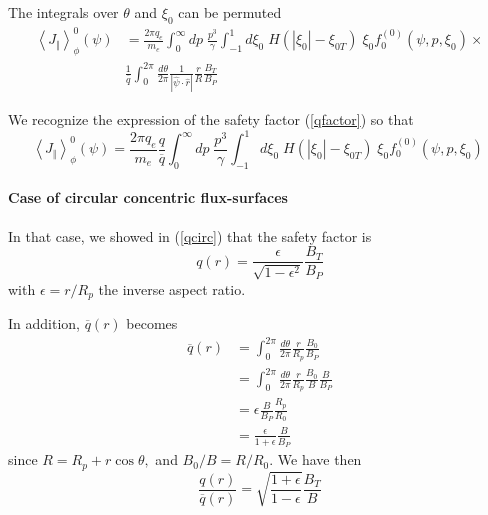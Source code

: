 The integrals over $\theta$ and $\xi_{0}$ can be permuted
\begin{align}
\left\langle J_{\Vert}\right\rangle _{\phi}^{0}\left( \psi\right) & =\frac{
2\pi q_{e}}{m_{e}}\int_{0}^{\infty}dp\;\frac{p^{3}}{\gamma}\int
_{-1}^{1}d\xi_{0}\;H\left( \left| \xi_{0}\right| -\xi_{0T}\right)
\;\xi_{0}f_{0}^{(0)}\left( \psi,p,\xi_{0}\right) \times  \nonumber \\
& \frac{1}{\overline{q}}\int_{0}^{2\pi}\frac{d\theta}{2\pi}\frac{1}{\left|
\widehat{\psi}\cdot\widehat{r}\right| }\frac{r}{R}\frac{B_{T}}{B_{P}}
\end{align}

We recognize the expression of the safety factor (\ref{qfactor}) so that
\begin{equation}
\left\langle J_{\Vert}\right\rangle _{\phi}^{0}\left( \psi\right) =\frac{
2\pi q_{e}}{m_{e}}\frac{q}{\overline{q}}\int_{0}^{\infty}dp\;\frac{p^{3}}{
\gamma}\int_{-1}^{1}d\xi_{0}\;H\left( \left| \xi _{0}\right|
-\xi_{0T}\right) \;\xi_{0}f_{0}^{(0)}\left( \psi,p,\xi _{0}\right) \;
\end{equation}

\paragraph{Case of circular concentric flux-surfaces}

In that case, we showed in (\ref{qcirc}) that the safety factor is
\begin{equation}
q\left( r\right) =\frac{\epsilon}{\sqrt{1-\epsilon^{2}}}\frac{B_{T}}{B_{P}}
\label{qcirc2}
\end{equation}
with $\epsilon=r/R_{p}$ the inverse aspect ratio.

In addition, $\overline{q}\left( r\right) $ becomes
\begin{align}
\overline{q}\left( r\right) & =\int_{0}^{2\pi}\frac{d\theta}{2\pi}\frac
{r}{R_{p}}\frac{B_{0}}{B_{P}}  \nonumber \\
& =\int_{0}^{2\pi}\frac{d\theta}{2\pi}\frac{r}{R_{p}}\frac{B_{0}}{B}\frac
{B}{B_{P}}  \nonumber \\
& =\epsilon\frac{B}{B_{P}}\frac{R_{p}}{R_{0}}  \nonumber \\
& =\frac{\epsilon}{1+\epsilon}\frac{B}{B_{P}}
\end{align}
since $R=R_{p}+r\cos\theta,$ and $B_{0}/B=R/R_{0}.$ We have then
\begin{equation}
\frac{q\left( r\right) }{\overline{q}\left( r\right) }=\sqrt {\frac{
1+\epsilon}{1-\epsilon}}\frac{B_{T}}{B}
\end{equation}

